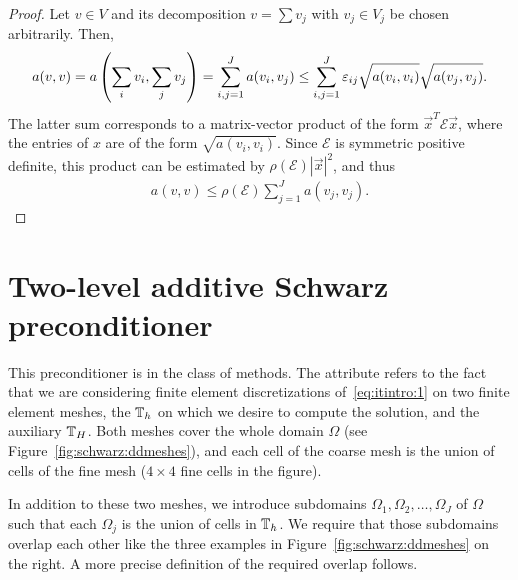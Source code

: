 \begin{proof}
  Let $v\in V$ and its decomposition $v=\sum v_j$ with $v_j\in V_j$ be
  chosen arbitrarily. Then,
  \begin{multline*}
    a(v,v)
    = a\left(\sum_i v_i, \sum_j v_j\right)
    = \sum_{i,j=1}^J a(v_i, v_j)
    \le \sum_{i,j=1}^J \epsilon_{ij} \sqrt{a(v_{\vphantom{j}i},v_i)} \sqrt{a(v_j,v_j)}.
  \end{multline*}
  The latter sum corresponds to a matrix-vector product of the form
  $\vec x^T \mathcal E \vec x$, where the entries of $x$ are of the
  form $\sqrt{a(v_i,v_i)}$. Since $\mathcal E$ is symmetric positive
  definite, this product can be estimated by $\rho(\mathcal E) |\vec
  x|^2$, and thus
  \begin{gather}
    \label{eq:schwarz:38}
    a(v,v) \le \rho(\mathcal E) \sum_{j=1}^J a(v_j,v_j).
  \end{gather}
\end{proof}

\section{Two-level additive Schwarz preconditioner}

\begin{intro}
  This preconditioner is in the class of  methods. The attribute  refers
  to the fact that we are considering finite element discretizations
  of~\eqref{eq:itintro:1} on two finite element meshes, the
   $\T_h$ on which we desire to compute the
  solution, and the auxiliary  $\T_H$. Both
  meshes cover the whole domain $\Omega$ (see
  Figure~\ref{fig:schwarz:ddmeshes}), and each cell of the coarse mesh
  is the union of cells of the fine mesh ($4\times 4$ fine cells in
  the figure).

  In addition to these two meshes, we introduce subdomains
  $\Omega_1,\Omega_2,\dots,\Omega_J$ of $\Omega$ such that each
  $\Omega_j$ is the union of cells in $\T_h$. We require that those
  subdomains overlap each other like the three examples in
  Figure~\ref{fig:schwarz:ddmeshes} on the right. A more precise
  definition of the required overlap follows.
\end{intro}

